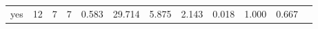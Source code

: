 \begin{longtable}{lp{1.00cm}p{1.00cm}p{1.00cm}p{1.00cm}p{1.00cm}p{1.00cm}p{1.00cm}p{1.00cm}p{1.00cm}p{1.00cm}p{1.00cm}}
yes       &                           12 &                  7 &                                 7 &                                      0.583 &                                 29.714 &                                        5.875 &                             2.143 &                                   0.018 &                        1.000 &                                        0.667 \\
\end{longtable}
